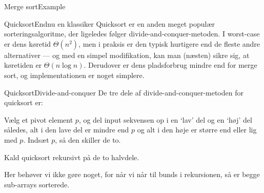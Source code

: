 \documentclass[aspectratio=1610]{beamer}
\begin{document}
\begin{frame}{Merge sort}{Example}

\end{frame}


\begin{frame}{Quicksort}{Endnu en klassiker}
    Quicksort er en anden meget populær sorteringsalgoritme, der ligeledes
    følger divide-and-conquer-metoden. I worst-case er dens køretid
    $\Theta(n^2)$, men i praksis er den typisk hurtigere end de fleste andre
    alternativer --- og med en simpel modifikation, kan man (næsten) sikre sig,
    at køretiden er $\Theta(n \log n)$. Derudover er dens pladsforbrug mindre
    end for merge sort, og implementationen er noget simplere.
\end{frame}


\begin{frame}{Quicksort}{Divide-and-conquer}
    De tre dele af divide-and-conquer-metoden for quicksort er:

    \begin{description}[Combine]
        \pause
        \item[Divide] Vælg et \alert{pivot element} $p$, og del input sekvensen
            op i en `lav' del og en `høj' del således, alt i den lave del er
            mindre end $p$ og alt i den høje er større end eller lig med $p$.
            Indsæt $p$, så den skiller de to.
        \pause
        \item[Conquer] Kald quicksort rekursivt på de to halvdele.
        \pause
        \item[Combine] Her behøver vi ikke gøre noget, for når vi når til bunds
            i rekursionen, så er begge sub-arrays sorterede.
    \end{description}
\end{frame}
\end{document}
